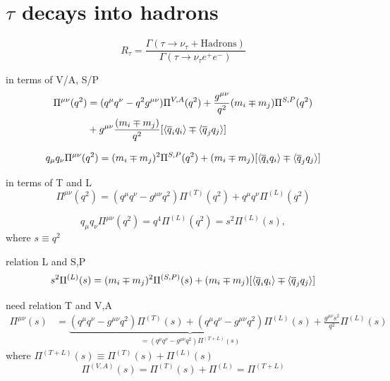 \documentclass[../../index.tex]{subfiles}
\begin{document}
\chapter{$\tau$ decays into hadrons}
\begin{equation}
  R_\tau = \frac{\Gamma(\tau \to \nu_\tau + \text{Hadrons})}{\Gamma(\tau \to \nu_\tau e^+ e^-)}
\end{equation}

in terms of V/A, S/P \cite{Broadhurst1975}
\begin{equation}
  \begin{split}
    \Pi^{\mu\nu}(q^2) &= (q^\mu q^\nu - q^2 g^{\mu\nu}) \Pi^{V,A}(q^2) + \frac{g^{\mu\nu}}{q^2} (m_i \mp m_j)\Pi^{S,P}(q^2) \\
    &+ g^{\mu\nu}\frac{(m_i \mp m_j)}{q^2} [ \langle \overline{q}_i q_i \rangle \mp \langle \overline{q}_j q_j \rangle]
  \end{split}
\end{equation}

\begin{equation}
  q_\mu q_\nu \Pi^{\mu\nu}(q^2) = (m_i \mp m_j)^2 \Pi^{S,P}(q^2) + (m_i \mp m_j)[\langle \overline{q}_i q_i \rangle \mp \langle \overline{q}_j q_j \rangle]
\end{equation}

in terms of T and L
\begin{equation}
  \Pi^{\mu\nu}(q^2) = (q^\mu q^\nu - g^{\mu\nu}q^2) \Pi^{(T)}(q^2) + q^\mu q^\nu \Pi^{(L)}(q^2)
\end{equation}

\begin{equation}
  q_\mu q_\nu \Pi^{\mu\nu}(q^2) = q^4 \Pi^{(L)}(q^2) = s^2 \Pi^{(L)}(s),
\end{equation}
where $s \equiv q^2$

relation L and S,P
\begin{equation}
  s^2 \Pi^{(L)}(s) = (m_i \mp m_j)^2 \Pi^{(S,P)}(s) + (m_i \mp m_j)[ \langle \overline{q}_i q_i \rangle \mp \langle \overline{q}_j q_j \rangle]
\end{equation}

need relation T and V,A
\begin{equation}
  \label{eq:longitudinalCorrelator}
  \begin{split}
    \Pi^{\mu\nu}(s) &= \underbrace{(q^\mu q^\nu - g^{\mu\nu}q^2)\Pi^{(T)}(s) + (q^\mu q^\nu - g^{\mu\nu} q^2)\Pi^{(L)}(s)}_{=(q^\mu q^\nu - g^{\mu\nu} q^2) \Pi^{(T+L)}(s)} + \frac{g^{\mu\nu}s^2}{q^2}\Pi^{(L)}(s)
  \end{split} 
\end{equation}
where $\Pi^{(T+L)}(s) \equiv \Pi^{(T)}(s) + \Pi^{(L)}(s)$
\begin{equation}
  \Pi^{(V,A)}(s) = \Pi^{(T)}(s) + \Pi^{(L)} = \Pi^{(T+L)}
\end{equation}
\end{document}
